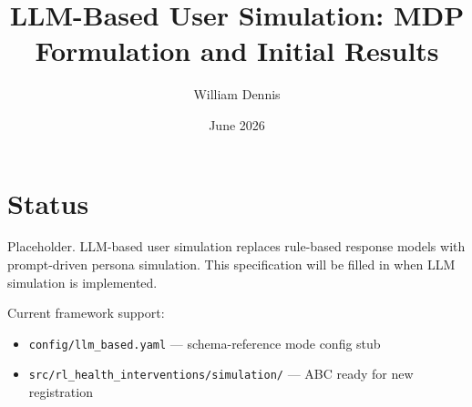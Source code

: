 \documentclass[11pt]{article}
\title{LLM-Based User Simulation: MDP Formulation and Initial Results}
\author{William Dennis}
\date{June 2026}
\begin{document}
\maketitle

\section*{Status}

Placeholder. LLM-based user simulation replaces rule-based response models
with prompt-driven persona simulation. This specification will be filled
in when LLM simulation is implemented.

Current framework support:
\begin{itemize}
  \item \texttt{config/llm\_based.yaml} — schema-reference mode config stub
  \item \texttt{src/rl\_health\_interventions/simulation/} — ABC ready for new registration
\end{itemize}
\end{document}
